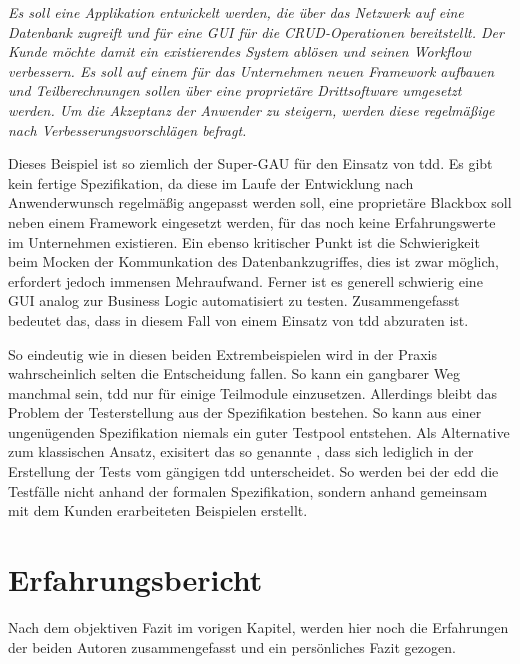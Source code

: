 \documentclass{mitschrift}
\begin{document}
\begin{beispiel}
  \textit{Es soll eine Applikation entwickelt werden, die über das Netzwerk auf eine
  Datenbank zugreift und für eine GUI für die CRUD-Operationen bereitstellt. Der
  Kunde möchte damit ein existierendes System ablösen und seinen Workflow verbessern. Es
  soll auf einem für das Unternehmen neuen Framework aufbauen und Teilberechnungen sollen
  über eine proprietäre Drittsoftware umgesetzt werden. Um die Akzeptanz der Anwender zu
  steigern, werden diese regelmäßige nach Verbesserungsvorschlägen befragt.}
  
  Dieses Beispiel ist so ziemlich der Super-GAU für den Einsatz von \gls{tdd}. Es gibt
  kein fertige Spezifikation, da diese im Laufe der Entwicklung nach Anwenderwunsch
  regelmäßig angepasst werden soll, eine proprietäre Blackbox soll neben einem Framework
  eingesetzt werden, für das noch keine Erfahrungswerte im Unternehmen existieren. Ein
  ebenso kritischer Punkt ist die Schwierigkeit beim Mocken der Kommunkation des 
  Datenbankzugriffes, dies ist zwar möglich, erfordert jedoch immensen Mehraufwand.
  Ferner ist es generell schwierig eine GUI analog zur Business Logic automatisiert zu
  testen. Zusammengefasst bedeutet das, dass in diesem Fall von einem Einsatz von \gls{tdd}
  abzuraten ist.
\end{beispiel}

So eindeutig wie in diesen beiden Extrembeispielen wird in der Praxis wahrscheinlich selten 
die Entscheidung fallen. So kann ein gangbarer Weg manchmal sein, \gls{tdd} nur für einige
Teilmodule einzusetzen. Allerdings bleibt das Problem der Testerstellung aus der Spezifikation
bestehen. So kann aus einer ungenügenden Spezifikation niemals ein guter Testpool entstehen. Als
Alternative zum klassischen Ansatz, exisitert das so genannte ,
dass sich lediglich in der Erstellung der Tests vom gängigen \gls{tdd} unterscheidet. So werden
bei der \gls{edd} die Testfälle nicht anhand der formalen Spezifikation, sondern
anhand gemeinsam mit dem Kunden erarbeiteten Beispielen erstellt.

\chapter{Erfahrungsbericht}\label{Erfahrungsbericht}
Nach dem objektiven Fazit im vorigen Kapitel, werden hier noch die Erfahrungen
der beiden Autoren zusammengefasst und ein persönliches Fazit gezogen.
\end{document}
